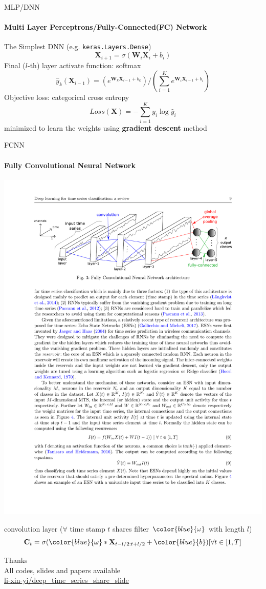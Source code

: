 \documentclass{ctexbeamer}
\begin{document}
\begin{frame}{MLP/DNN}
	\framesubtitle{Multi Layer Perceptrons/Fully-Connected(FC) Network}
	The Simplest DNN (e.g. \texttt{keras.Layers.Dense})
	$$\mathbf{X}_{i+1} = \sigma (\mathbf{W}_i \mathbf{X}_i + b_i)$$
	Final ($l$-th) layer activate function: softmax
	$$\hat {y} _{k} (\mathbf{X}_{l-1}) = (e^{\mathbf{W}_k \mathbf{X}_{l-1} + b_k}) /
	(\sum_{i=1}^{K} {e^{\mathbf{W}_i \mathbf{X}_{l-1} + b_i}})$$
	Objective loss:  categorical cross entropy
	$$Loss(\textbf{X}) = - \sum_{i=1}^{K}{y_i} \log {\hat y}_i$$
	minimized to learn the weights using \textbf{gradient descent} method
\end{frame}

\begin{frame}{FCNN}
	\framesubtitle{Fully Convolutional Neural Network}
	\begin{center}
		\includegraphics[width=1.05\textwidth]{figure/fcnn}
	\end{center}
	convolution layer ($\forall$ time stamp $t$ shares filter $\color{blue}{\omega}$ with length $l$)
	$$\mathbf{C}_t = \sigma ({\color{blue}{\omega}}* \mathbf{X}_{t-l/2:t+l/2} + {\color{blue}{b}}) | \forall t \in [1,T ]$$
\end{frame}


\begin{frame}{}
  \begin{center}
  {\Huge{Thanks}} \\
  All codes, slides and papers available\\
  \faGithub \href{https://github.com/li-xin-yi/deep_time_series_share_slide}{li-xin-yi/deep\_time\_series\_share\_slide}
\end{center}
\end{frame}
\end{document}
